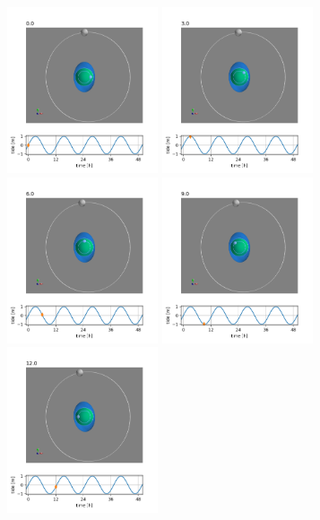\begin{figure}[hbtp]
  \begin{center}
    \includegraphics[width=1.75in]{figs/Waves/AboveEq/frame0000}
    \includegraphics[width=1.75in]{figs/Waves/AboveEq/frame0030}
    \includegraphics[width=1.75in]{figs/Waves/AboveEq/frame0060}
    \includegraphics[width=1.75in]{figs/Waves/AboveEq/frame0090}
    \includegraphics[width=1.75in]{figs/Waves/AboveEq/frame0120}

\end{center}
\end{figure}

